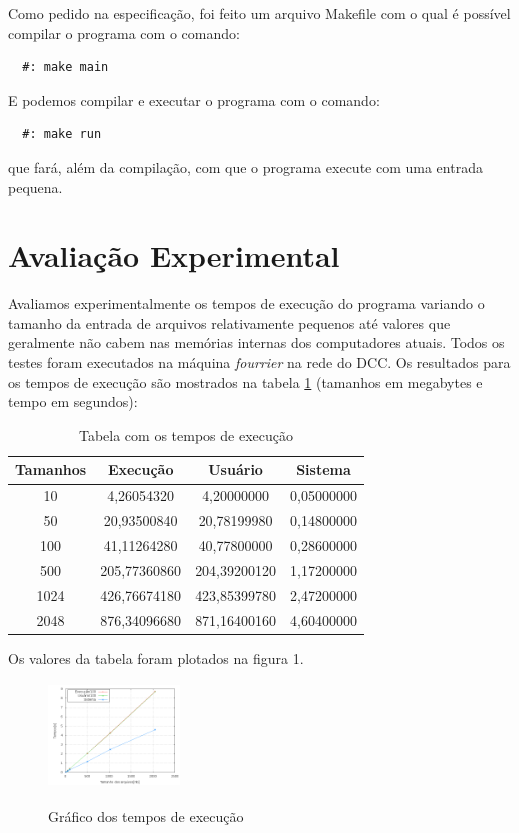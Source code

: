 \documentclass[12pt]{article}
\begin{document}
Como pedido na especificação, foi feito um arquivo Makefile com o qual é possível compilar
o programa com o comando: 
\begin{verbatim}
  #: make main
\end{verbatim}

E podemos compilar e executar o programa com o comando:
\begin{verbatim}
  #: make run
\end{verbatim}
que fará, além da compilação, com que o programa execute com uma entrada pequena.

\section{Avaliação Experimental}
\label{avaliacao_experimental}

Avaliamos experimentalmente os tempos de execução do programa variando o tamanho da entrada
de arquivos relativamente pequenos até valores que geralmente não cabem nas memórias internas 
dos computadores atuais. Todos os testes foram executados na máquina \textit{fourrier} na rede 
do DCC. Os resultados para os tempos de execução são mostrados na tabela \ref{tempossss} (tamanhos em megabytes 
e tempo em segundos):

\begin{table}[htb]
\centering
\caption{Tabela com os tempos de execução}
\label{tempossss}
\begin{tabular}{|c|c|c|c|}
\hline Tamanhos & Execução & Usuário & Sistema \\ 
\hline 10 & 4,26054320
 & 4,20000000
 & 0,05000000
 \\ 
\hline 50 & 20,93500840
 & 20,78199980
 & 0,14800000
 \\ 
\hline 100 & 41,11264280
 & 40,77800000
 & 0,28600000
 \\ 
\hline 500 & 205,77360860
 & 204,39200120
 & 1,17200000
 \\ 
\hline 1024 & 426,76674180
 & 423,85399780
 & 2,47200000
 \\ 
\hline 2048 & 876,34096680
 & 871,16400160
 & 4,60400000
 \\ 
\hline
\end{tabular} 
\end{table}

Os valores da tabela foram plotados na figura 1.

\begin{figure}[ht!]
\centering
\includegraphics[width=3.5cm,height=2.8cm]{avaliacoes/testes.png}
\label{img:resss}
\caption{Gráfico dos tempos de execução}
\end{figure}
\end{document}
